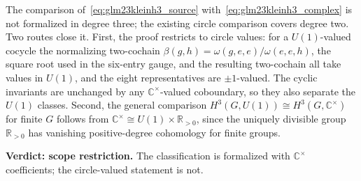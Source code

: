 \documentclass{article}
\begin{document}
The comparison of~\eqref{eq:glm23kleinh3_source}
with~\eqref{eq:glm23kleinh3_complex} is not formalized in degree three; the
existing circle comparison covers degree two. Two routes close it.
First, the proof restricts to circle values: for a $U(1)$-valued cocycle the
normalizing two-cochain $\beta(g,h)=\omega(g,e,e)/\omega(e,e,h)$, the square
root used in the six-entry gauge, and the resulting two-cochain all take
values in $U(1)$, and the eight representatives are $\pm1$-valued. The cyclic
invariants are unchanged by any $\mathbb{C}^\times$-valued coboundary, so they
also separate the $U(1)$ classes. Second, the general comparison
$H^3(G,U(1))\cong H^3(G,\mathbb{C}^\times)$ for finite $G$ follows from
$\mathbb{C}^\times\cong U(1)\times\mathbb{R}_{>0}$, since the uniquely
divisible group $\mathbb{R}_{>0}$ has vanishing positive-degree cohomology
for finite groups.

\textbf{Verdict: scope restriction.} The classification is formalized with
$\mathbb{C}^\times$ coefficients; the circle-valued statement is not.



\end{document}
